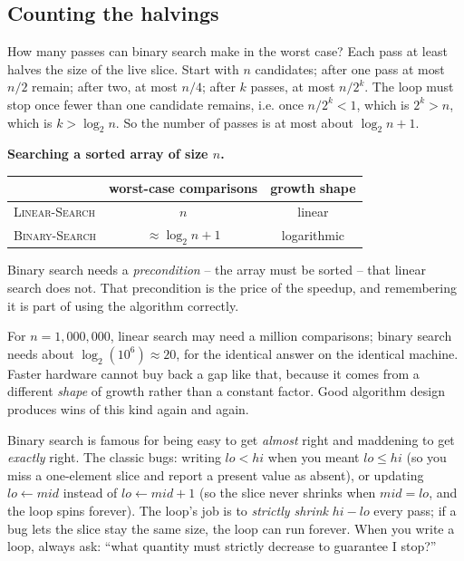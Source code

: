 \subsection{Counting the halvings}

How many passes can binary search make in the worst case? Each pass at least halves
the size of the live slice. Start with $n$ candidates; after one pass at most
$n/2$ remain; after two, at most $n/4$; after $k$ passes, at most $n/2^k$. The loop
must stop once fewer than one candidate remains, i.e. once $n/2^k < 1$, which is
$2^k > n$, which is $k > \log_2 n$. So the number of passes is at most about
$\log_2 n + 1$.

\begin{complexitybox}
\textbf{Searching a sorted array of size $n$.}
\begin{center}
\begin{tabular}{l c c}
\toprule
 & worst-case comparisons & growth shape \\
\midrule
\textsc{Linear-Search} & $n$ & linear \\
\textsc{Binary-Search} & $\approx \log_2 n + 1$ & logarithmic \\
\bottomrule
\end{tabular}
\end{center}
Binary search needs a \emph{precondition} -- the array must be sorted -- that linear
search does not. That precondition is the price of the speedup, and remembering it is
part of using the algorithm correctly.
\end{complexitybox}

For $n = 1{,}000{,}000$, linear search may need a million comparisons; binary search
needs about $\log_2(10^6) \approx 20$, for the identical answer on the identical
machine. Faster hardware cannot buy back a gap like that, because it comes from a
different \emph{shape} of growth rather than a constant factor. Good algorithm design
produces wins of this kind again and again.

\begin{trapbox}
Binary search is famous for being easy to get \emph{almost} right and maddening to
get \emph{exactly} right. The classic bugs: writing $lo < hi$ when you meant
$lo \le hi$ (so you miss a one-element slice and report a present value as absent),
or updating $lo \gets mid$ instead of $lo \gets mid + 1$ (so the slice never shrinks
when $mid = lo$, and the loop spins forever). The loop's job is to \emph{strictly
shrink} $hi - lo$ every pass; if a bug lets the slice stay the same size, the loop
can run forever. When you write a loop, always ask: ``what quantity must strictly decrease
to guarantee I stop?''
\end{trapbox}

